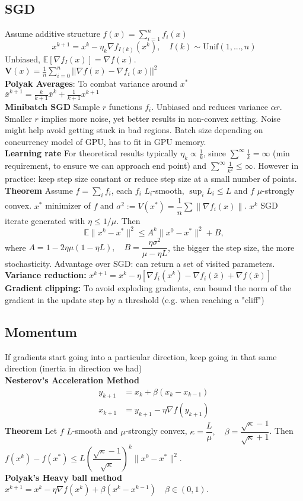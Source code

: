 \subsection*{SGD}
Assume additive structure $f(x)=\sum_{i=1}^nf_i(x)$
$$x^{k+1}=x^k-\eta_k\nabla f_{I(k)}(x^k),\quad I(k)\sim \text{Unif}(1,...,n)$$
Unbiased, $\mathbb{E}[\nabla f_I(x)] = \nabla f(x)$.\\
$\mathbf V(x)=\frac{1}{n}\sum_{i=0}^n||\nabla f(x)-\nabla f_i(x)||^2$\\
\textbf{Polyak Averages}: To combat variance around $x^*$\\
$\bar{x}^{k+1}=\frac{k}{k+1}\bar{x}^k+\frac{1}{k+1}x^{k+1}$\\
\textbf{Minibatch SGD}
Sample $r$ functions $f_i$. Unbiased and reduces variance $\alpha r$. Smaller $r$ implies more noise, yet better results in non-convex setting. Noise might help avoid getting stuck in bad regions. Batch size depending on concurrency model of GPU, has to fit in GPU memory.\\
\textbf{Learning rate}
For theoretical results typically $\eta_k \propto \frac{1}{k}$, since $\sum^{\infty}\frac{1}{k} = \infty$ (min requirement, to ensure we can approach end point) and  $\sum^{\infty}\frac{1}{k^2} \leq \infty$. However in practice: keep step size constant or reduce step size at a small number of points.\\
\textbf{Theorem} Assume $f = \sum_i f_i$, each $f_i$ $L_i$-smooth, $\sup_iL_i\leq L$ and $f$ $\mu$-strongly convex. $x^*$ minimizer of $f$ and $\sigma^2:=V(x^*)=\dfrac{1}{n}\sum\|\nabla f_i(x)\|$. $x^k$ SGD iterate generated with $\eta\leq1/\mu$. Then
$$\mathbb{E}\|x^k-x^*\|^2\leq A^k\|x^0-x^*\|^2+B,$$
where $A=1-2\eta\mu(1-\eta L),\quad B=\dfrac{\eta\sigma^2}{\mu-\eta L}$, the bigger the step size, the more stochasticity. Advantage over SGD: can return a set of visited parameters.\\
\textbf{Variance reduction: } $x^{k+1}=x^k-\eta[\nabla f_i(x^k)-\nabla f_i(\bar x)+\nabla f(\bar x)]$\\
\textbf{Gradient clipping: } To avoid exploding gradients, can bound the norm of the gradient in the update step by a threshold (e.g. when reaching a "cliff")
\subsection*{Momentum} If gradients start going into a particular direction, keep going in that same direction (inertia in direction we had)\\
\textbf{Nesterov's Acceleration Method}
\begin{align*}
    y_{k+1}&=x_k+\beta(x_k-x_{k-1})\\
    x_{k+1}&=y_{k+1}-\eta\nabla f(y_{k+1})
\end{align*}
\textbf{Theorem} Let $f$ $L$-smooth and $\mu$-strongly convex, $\kappa = \dfrac{L}{\mu},\quad \beta = \dfrac{\sqrt{\kappa}-1}{\sqrt{\kappa}+1}$. Then
$f(x^k)-f(x^*)\leq L\left(\dfrac{\sqrt{\kappa}-1}{\sqrt{\kappa}}\right)^k\|x^0-x^*\|^2.$\\
\textbf{Polyak's Heavy ball method}\\
$x^{k+1} = x^k -\eta\nabla f(x^k)+\beta(x^k-x^{k-1})\quad \beta \in (0,1).$
